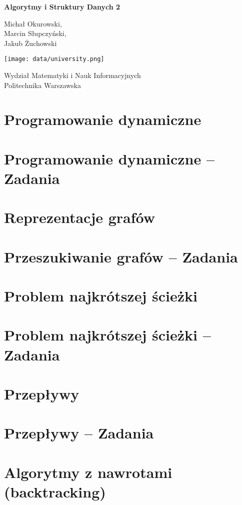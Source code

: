 




\begin{titlepage}
    \begin{center}
        \vspace*{1cm}

        \Huge

        \textbf{Algorytmy i Struktury Danych 2}

        \vspace{1.5cm}

        \LARGE

        Michał Okurowski, \\
		Marcin Słupczyński, \\
		Jakub Żuchowski
        \vfill  

        \vspace{0.8cm}

        \texttt{[image: data/university.png]}

        Wydział Matematyki i Nauk Informacyjnych\\
        Politechnika Warszawska\\
    \end{center}
\end{titlepage}

\tableofcontents
\pagebreak

\section{Programowanie dynamiczne}

\section{Programowanie dynamiczne -- Zadania}

\section{Reprezentacje grafów}

\section{Przeszukiwanie grafów -- Zadania}

\section{Problem najkrótszej ścieżki}

\section{Problem najkrótszej ścieżki -- Zadania}

\section{Przepływy}

\section{Przepływy -- Zadania}

\section{Algorytmy z nawrotami (backtracking)}

